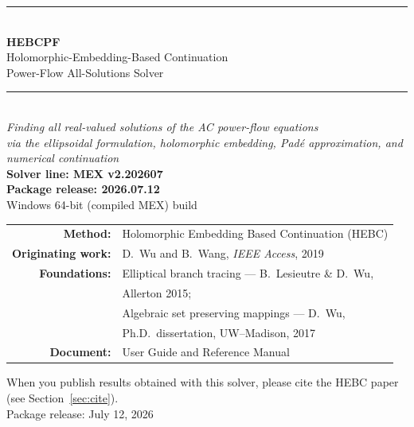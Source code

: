 \documentclass[11pt,a4paper]{article}
\begin{document}
\begin{titlepage}
\centering
\vspace*{2.2cm}
{\color{rule}\rule{\textwidth}{1.2pt}}\\[8pt]
{\Huge\bfseries HEBCPF}\\[10pt]
{\LARGE Holomorphic-Embedding-Based Continuation}\\[4pt]
{\LARGE Power-Flow All-Solutions Solver}\\[10pt]
{\color{rule}\rule{\textwidth}{1.2pt}}\\[18pt]
{\large\itshape Finding \emph{all} real-valued solutions of the AC power-flow equations}\\[6pt]
{\large\itshape via the ellipsoidal formulation, holomorphic embedding, Pad\'e approximation, and numerical continuation}\\[26pt]

{\large\bfseries Solver line: MEX v2.202607}\\[2pt]
{\large\bfseries Package release: 2026.07.12}\\[4pt]
{\large Windows 64-bit (compiled MEX) build}\\[30pt]

\begin{tabular}{rl}
\textbf{Method:} & Holomorphic Embedding Based Continuation (HEBC)\\[3pt]
\textbf{Originating work:} & D.\ Wu and B.\ Wang, \emph{IEEE Access}, 2019\\[6pt]
\textbf{Foundations:} & Elliptical branch tracing --- B.\ Lesieutre \& D.\ Wu,\\[1pt]
                      & Allerton 2015;\\[3pt]
                      & Algebraic set preserving mappings --- D.\ Wu,\\[1pt]
                      & Ph.D.\ dissertation, UW--Madison, 2017\\[6pt]
\textbf{Document:} & User Guide and Reference Manual\\
\end{tabular}

\vfill
{\small When you publish results obtained with this solver, please cite the HEBC
paper (see Section~\ref{sec:cite}).}\\[6pt]
{\small Package release: July 12, 2026}
\end{titlepage}

\tableofcontents
\newpage

\end{document}
